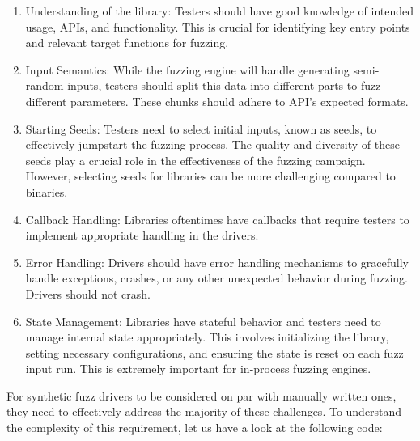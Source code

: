 \documentclass[a4paper,11pt,oneside]{report}
\begin{document}
\begin{enumerate}
  \item Understanding of the library: Testers should have good knowledge of intended usage,
  APIs, and functionality. This is crucial for identifying key entry points and relevant
  target functions for fuzzing.
  \item Input Semantics: While the fuzzing engine will handle generating semi-random inputs,
  testers should split this data into different parts to fuzz different parameters. These
  chunks should adhere to API's expected formats. 
  \item Starting Seeds: Testers need to select initial inputs, known as seeds, to effectively
  jumpstart the fuzzing process. The quality and diversity of these seeds play a crucial
  role in the effectiveness of the fuzzing campaign. However, selecting seeds for libraries
  can be more challenging compared to binaries.
  \item Callback Handling: Libraries oftentimes have callbacks that require testers
  to implement appropriate handling in the drivers. 
  \item Error Handling: Drivers should have error handling mechanisms to gracefully 
  handle exceptions, crashes, or any other unexpected behavior during fuzzing. Drivers
  should not crash.
  \item State Management: Libraries have stateful behavior and testers need to manage
  internal state appropriately. This involves initializing the library, setting necessary
  configurations, and ensuring the state is reset on each fuzz input run. This is extremely 
  important for in-process fuzzing engines.
\end{enumerate}


For synthetic fuzz drivers to be considered on par with manually written ones,
they need to effectively address the majority of these challenges. 
To understand the complexity of this requirement, let us have a look at the following code:
\\
\\
\end{document}
